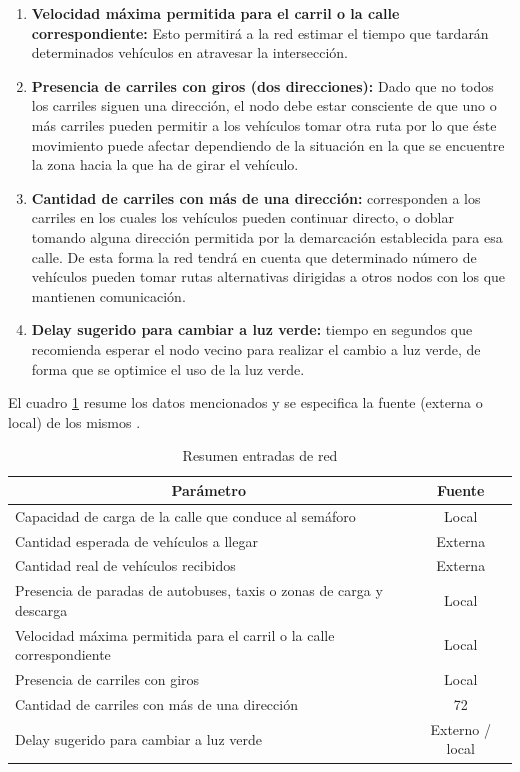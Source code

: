 \begin{enumerate}
	\item \textbf{Velocidad m\'{a}xima permitida para el carril o la calle correspondiente:} Esto permitir\'{a} a la red estimar el tiempo que tardar\'{a}n determinados veh\'{i}culos en atravesar la intersecci\'{o}n.

	\item \textbf{Presencia de carriles con giros (dos direcciones):} Dado que no todos los carriles siguen una direcci\'{o}n, el nodo debe estar consciente de que uno o m\'{a}s carriles pueden permitir a los veh\'{i}culos tomar otra ruta por lo que \'{e}ste movimiento puede afectar dependiendo de la situaci\'{o}n en la que se encuentre la zona hacia la que ha de girar el veh\'{i}culo.

	\item \textbf{Cantidad de carriles con m\'{a}s de una direcci\'{o}n:} corresponden a los carriles en los cuales los veh\'{i}culos pueden continuar directo, o doblar tomando alguna direcci\'{o}n permitida por la demarcaci\'{o}n establecida para esa calle. De esta forma la red tendr\'{a} en cuenta que determinado n\'{u}mero de veh\'{i}culos pueden tomar rutas alternativas dirigidas a otros nodos con los que mantienen comunicaci\'{o}n.

	\item \textbf{Delay sugerido para cambiar a luz verde:} tiempo en segundos que recomienda esperar el nodo vecino para realizar el cambio a luz verde, de forma que se optimice el uso de la luz verde.
\end{enumerate}


El cuadro \ref{tab:nninputs} resume los datos mencionados y se especifica la fuente (externa o local) de los mismos .

\begin{table}[H]
	\centering
	\begin{tabular}{p{8.5cm}|c}
		\multicolumn{1}{c}{\centering\textbf{Par\'{a}metro}} & \multicolumn{1}{c}{\centering\textbf{Fuente}}\\
		\hline
		\hline
		Capacidad de carga de la calle que conduce al sem\'{a}foro & Local\\
		Cantidad esperada de veh\'{i}culos a llegar & Externa\\
		Cantidad real de veh\'{i}culos recibidos & Externa\\
		Presencia de paradas de autobuses, taxis o zonas de carga y descarga & Local\\
		Velocidad m\'{a}xima permitida para el carril o la calle correspondiente & Local\\
		Presencia de carriles con giros & Local\\
		Cantidad de carriles con m\'{a}s de una direcci\'{o}n & 72\\
		Delay sugerido para cambiar a luz verde & Externo / local\\
		\hline
	\end{tabular}
	\caption{Resumen entradas de red}
	\label{tab:nninputs}
\end{table}



